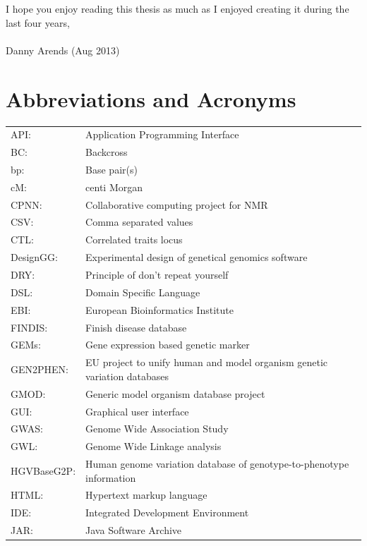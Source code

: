 I hope you enjoy reading this thesis as much as I enjoyed creating it during the last four years,\\\\

Danny Arends (Aug 2013)

\newpage
\section*{Abbreviations and Acronyms}
{\footnotesize
\begin{tabular}{ l l }
API:         & Application Programming Interface\\
BC:          & Backcross \\
bp:          & Base pair(s) \\
cM:          & centi Morgan \\
CPNN:        & Collaborative computing project for NMR\\
CSV:         & Comma separated values\\
CTL:         & Correlated traits locus \\
DesignGG:    & Experimental design of genetical genomics software\\
DRY:         & Principle of don't repeat yourself\\
DSL:         & Domain Specific Language\\
EBI:         & European Bioinformatics Institute\\
FINDIS:      & Finish disease database\\
GEMs:        & Gene expression based genetic marker\\
GEN2PHEN:    & EU project to unify human and model organism genetic variation databases\\
GMOD:        & Generic model organism database project\\
GUI:         & Graphical user interface\\
GWAS:        & Genome Wide Association Study\\
GWL:         & Genome Wide Linkage analysis\\
HGVBaseG2P:  & Human genome variation database of genotype-to-phenotype information\\
HTML:        & Hypertext markup language\\
IDE:         & Integrated Development Environment\\
JAR:         & Java Software Archive\\

\end{tabular}}
